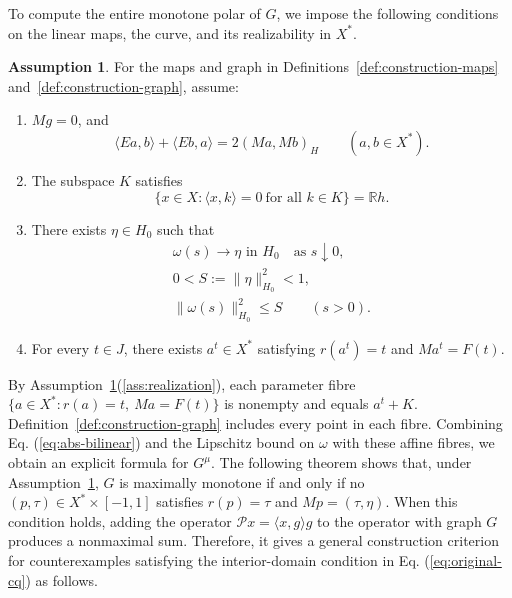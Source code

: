 \documentclass[11pt]{article}
\newcommand{\R}{\mathbb R}
\newcommand{\pair}[2]{\langle #1,#2\rangle}
\theoremstyle{definition}
\newtheorem{assumption}{Assumption}
\theoremstyle{remark}
\begin{document}
To compute the entire monotone polar of $G$, we impose the following conditions on the linear maps, the curve, and its realizability in $X^*$.
\begin{assumption}\label{ass:construction}
For the maps and graph in Definitions~\ref{def:construction-maps} and~\ref{def:construction-graph}, assume:
\begin{enumerate}
\renewcommand{\theenumi}{H\arabic{enumi}}
\renewcommand{\labelenumi}{(\theenumi)}
\item\label{ass:bilinear} $Mg=0$, and
\begin{equation}
\pair{Ea}{b}+\pair{Eb}{a}=2(Ma,Mb)_H
\qquad(a,b\in X^*).
\label{eq:abs-bilinear}
\end{equation}

\item\label{ass:annihilator} The subspace $K$ satisfies
\begin{equation}
\{x\in X:\pair{x}{k}=0\ \text{for all }k\in K\}=\R h.
\label{eq:abs-annihilator}
\end{equation}

\item\label{ass:curve-limit} There exists $\eta\in H_0$ such that
\begin{equation}
\begin{gathered}
\omega(s)\longrightarrow\eta\text{ in }H_0
\quad\text{as }s\downarrow0,\\
0<S:=\|\eta\|_{H_0}^2<1,\\
\|\omega(s)\|_{H_0}^2\le S\qquad(s>0).
\end{gathered}
\label{eq:abs-tail}
\end{equation}

\item\label{ass:realization} For every $t\in J$, there exists $a^t\in X^*$
satisfying $r(a^t)=t$ and $Ma^t=F(t)$.
\end{enumerate}
\end{assumption}
By Assumption~\ref{ass:construction}\textup{(\ref{ass:realization})}, each parameter fibre $\{a\in X^*:r(a)=t,\ Ma=F(t)\}$ is nonempty and equals $a^t+K$. Definition~\ref{def:construction-graph} includes every point in each fibre. Combining Eq. (\ref{eq:abs-bilinear}) and the Lipschitz bound on $\omega$ with these affine fibres, we obtain an explicit formula for $G^\mu$. The following theorem shows that, under Assumption~\ref{ass:construction}, $G$ is maximally monotone if and only if no $(p,\tau)\in X^*\times[-1,1]$ satisfies $r(p)=\tau$ and $Mp=(\tau,\eta)$. When this condition holds, adding the operator $\mathcal P x=\pair{x}{g}g$ to the operator with graph $G$ produces a nonmaximal sum. Therefore, it gives a general construction criterion for counterexamples satisfying the interior-domain condition in Eq. (\ref{eq:original-cq}) as follows.
\end{document}
